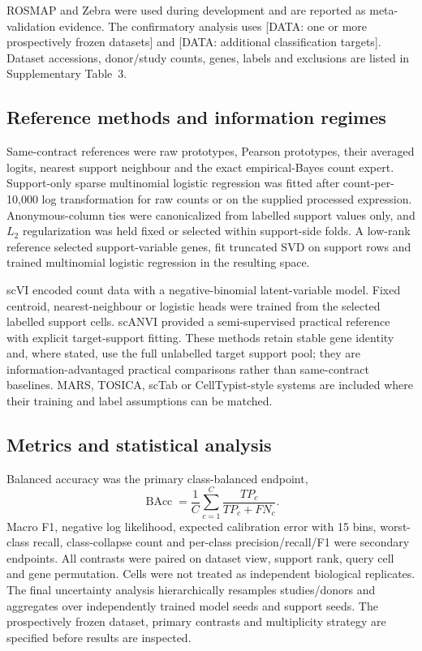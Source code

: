 \documentclass[12pt]{article}
\newcommand{\dataplaceholder}[1]{\textcolor{purple!70!black}{[DATA: #1]}}
\begin{document}
ROSMAP and Zebra were used during development and are reported as meta-validation evidence. The confirmatory analysis uses \dataplaceholder{one or more prospectively frozen datasets} and \dataplaceholder{additional classification targets}. Dataset accessions, donor/study counts, genes, labels and exclusions are listed in Supplementary Table~3.

\subsection*{Reference methods and information regimes}

Same-contract references were raw prototypes, Pearson prototypes, their averaged logits, nearest support neighbour and the exact empirical-Bayes count expert. Support-only sparse multinomial logistic regression was fitted after count-per-10,000 log transformation for raw counts or on the supplied processed expression. Anonymous-column ties were canonicalized from labelled support values only, and $L_2$ regularization was held fixed or selected within support-side folds. A low-rank reference selected support-variable genes, fit truncated SVD on support rows and trained multinomial logistic regression in the resulting space.

scVI encoded count data with a negative-binomial latent-variable model\cite{lopez2018scvi}. Fixed centroid, nearest-neighbour or logistic heads were trained from the selected labelled support cells. scANVI provided a semi-supervised practical reference with explicit target-support fitting\cite{xu2021scanvi}. These methods retain stable gene identity and, where stated, use the full unlabelled target support pool; they are information-advantaged practical comparisons rather than same-contract baselines. MARS, TOSICA, scTab or CellTypist-style systems are included where their training and label assumptions can be matched\cite{brbic2020mars,chen2023tosica,fischer2024sctab}.

\subsection*{Metrics and statistical analysis}

Balanced accuracy was the primary class-balanced endpoint,
\begin{equation}
\operatorname{BAcc}=\frac{1}{C}\sum_{c=1}^{C}\frac{TP_c}{TP_c+FN_c}.
\end{equation}
Macro F1, negative log likelihood, expected calibration error with 15 bins, worst-class recall, class-collapse count and per-class precision/recall/F1 were secondary endpoints. All contrasts were paired on dataset view, support rank, query cell and gene permutation. Cells were not treated as independent biological replicates. The final uncertainty analysis hierarchically resamples studies/donors and aggregates over independently trained model seeds and support seeds. The prospectively frozen dataset, primary contrasts and multiplicity strategy are specified before results are inspected.
\end{document}

